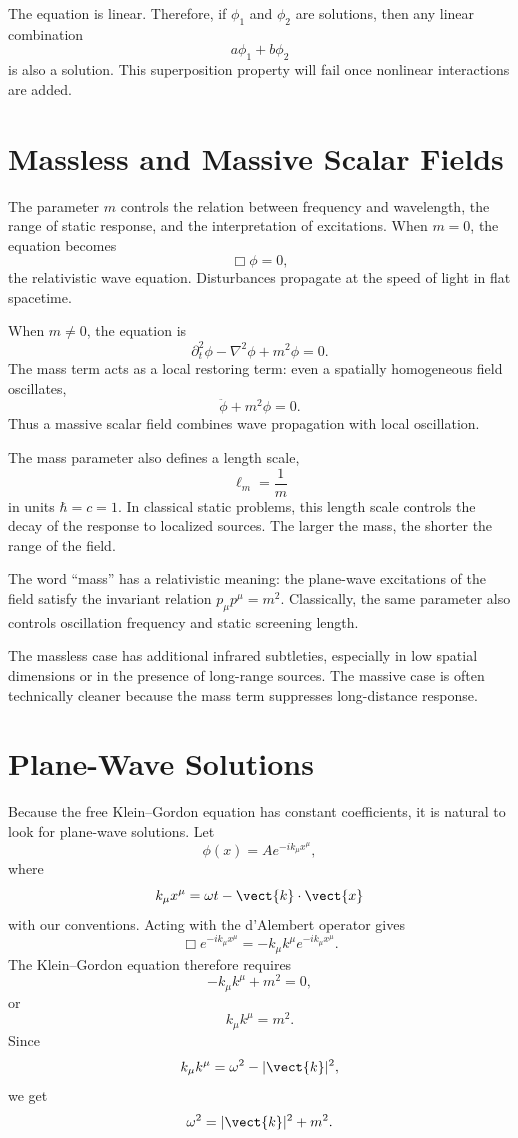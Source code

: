 The equation is linear. Therefore, if \(\phi_1\) and \(\phi_2\) are solutions,
then any linear combination
\[
    a\phi_1+b\phi_2
\]
is also a solution. This superposition property will fail once nonlinear
interactions are added.

\section{Massless and Massive Scalar Fields}

The parameter \(m\) controls the relation between frequency and wavelength, the
range of static response, and the interpretation of excitations. When
\(m=0\), the equation becomes
\[
    \Box\phi=0,
\]
the relativistic wave equation. Disturbances propagate at the speed of light in
flat spacetime.

When \(m\neq0\), the equation is
\[
    \partial_t^2\phi-\nabla^2\phi+m^2\phi=0.
\]
The mass term acts as a local restoring term: even a spatially homogeneous field
oscillates,
\[
    \ddot\phi+m^2\phi=0.
\]
Thus a massive scalar field combines wave propagation with local oscillation.

The mass parameter also defines a length scale,
\[
    \ell_m=\frac{1}{m}
\]
in units \(\hbar=c=1\). In classical static problems, this length scale controls
the decay of the response to localized sources. The larger the mass, the shorter
the range of the field.

\begin{remarkbox}
The word ``mass'' has a relativistic meaning: the plane-wave excitations of the
field satisfy the invariant relation \(p_\mu p^\mu=m^2\). Classically, the same
parameter also controls oscillation frequency and static screening length.
\end{remarkbox}

The massless case has additional infrared subtleties, especially in low spatial
dimensions or in the presence of long-range sources. The massive case is often
technically cleaner because the mass term suppresses long-distance response.

\section{Plane-Wave Solutions}

Because the free Klein--Gordon equation has constant coefficients, it is natural
to look for plane-wave solutions. Let
\[
    \phi(x)=A e^{-ik_\mu x^\mu},
\]
where
\[
    k_\mu x^\mu=\omega t-\vect{k}\cdot\vect{x}
\]
with our conventions. Acting with the d'Alembert operator gives
\[
    \Box e^{-ik_\mu x^\mu}=-k_\mu k^\mu e^{-ik_\mu x^\mu}.
\]
The Klein--Gordon equation therefore requires
\[
    -k_\mu k^\mu+m^2=0,
\]
or
\[
    k_\mu k^\mu=m^2.
\]
Since
\[
    k_\mu k^\mu=\omega^2-|\vect{k}|^2,
\]
we get
\[
    \omega^2=|\vect{k}|^2+m^2.
\]

